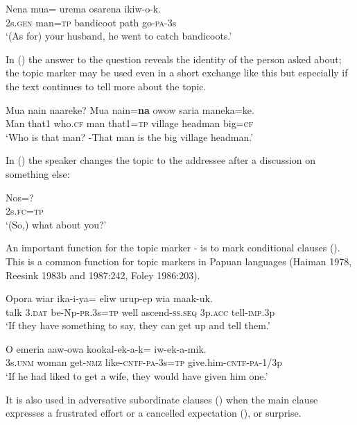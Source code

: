 \ea%
\label{ex:x779}
\gll Nena mua= urema osarena ikiw-o-k. \\
2s.\textsc{gen} man=\textsc{tp} bandicoot path go-\textsc{pa}-3s\\
\glt`(As for) your husband, he went to catch bandicoots.'
\z

In () the answer to the question reveals the identity of the person asked about; the topic marker may be used even in a short exchange like this but especially if the text continues to tell more about the topic. 

\ea%
\label{ex:x1751}
\gll Mua nain naareke? Mua nain=\textbf{na} owow saria maneka=ke. \\
Man that1 who.\textsc{cf} man that1=\textsc{tp} village headman big=\textsc{cf}\\
\glt`Who is that man? -That man is the big village headman.'
\z

In () the speaker changes the topic to the addressee after a discussion on something else:

\ea%
\label{ex:x780}
\gll Nos=? \\
2s.\textsc{fc}=\textsc{tp}\\
\glt`(So,) what about you?'
\z

An important function for the topic marker - is to mark conditional clauses (). This is a common function for topic markers in Papuan languages (Haiman 1978, Reesink 1983b and 1987:242, Foley 1986:203).

\ea%
\label{ex:x744}
\gll Opora wiar ika-i-ya= eliw urup-ep wia maak-uk.\\
talk 3.\textsc{dat} be-Np-\textsc{pr}.3s=\textsc{tp} well ascend-\textsc{ss}.\textsc{seq} 3p.\textsc{acc} tell-\textsc{imp}.3p\\
\glt`If they have something to say, they can get up and tell them.'
\z

\ea%
\label{ex:x745}
\gll O emeria aaw-owa kookal-ek-a-k= iw-ek-a-mik.\\
3s.\textsc{unm} woman get-\textsc{nmz} like-\textsc{cntf}-\textsc{pa}-3s=\textsc{tp} give.him-\textsc{cntf}-\textsc{pa}-1/3p\\
\glt`If he had liked to get a wife, they would have given him one.'
\z

It is also used in adversative subordinate clauses () when the main clause expresses a frustrated effort or a cancelled expectation (), or surprise.

